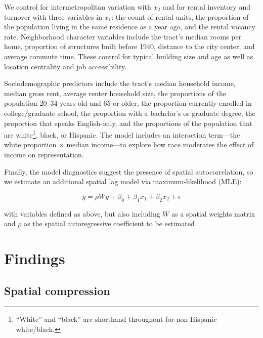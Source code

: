 \documentclass[11pt,letterpaper]{article}
\begin{document}
We control for intermetropolitan variation with $x_2$ and for rental inventory and turnover with three variables in $x_1$: the count of rental units, the proportion of the population living in the same residence as a year ago, and the rental vacancy rate. Neighborhood character variables include the tract's median rooms per home, proportion of structures built before 1940, distance to the city center, and average commute time. These control for typical building size and age as well as location centrality and job accessibility.

Sociodemographic predictors include the tract's median household income, median gross rent, average renter household size, the proportions of the population 20--34 years old and 65 or older, the proportion currently enrolled in college/graduate school, the proportion with a bachelor's or graduate degree, the proportion that speaks English-only, and the proportions of the population that are white\footnote{\enquote{White} and \enquote{black} are shorthand throughout for non-Hispanic white/black.}, black, or Hispanic. The model includes an interaction term---the white proportion $\times$ median income---to explore how race moderates the effect of income on representation.

Finally, the model diagnostics suggest the presence of spatial autocorrelation, so we estimate an additional spatial lag model via maximum-likelihood (MLE):

\begin{equation}
\label{eq:regression_formula}
y = \rho Wy + \beta_0 + \beta_1 x_1 + \beta_2 x_2 + \epsilon
\end{equation}

with variables defined as above, but also including $W$ as a spatial weights matrix and $\rho$ as the spatial autoregressive coefficient to be estimated \citep{anselin_modern_2014}.


\section{Findings}

\subsection{Spatial compression}
\end{document}
